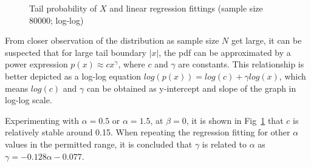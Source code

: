 \documentclass[11pt, twocolumn]{article}
\begin{document}
\begin{figure}[h]
    \centering

    \caption{Tail probability of $X$ and linear regression fittings (sample size 80000; log-log)}
    \label{fig:q4_2_linreg}
\end{figure}

From closer observation of the distribution as sample size $N$ get large, it can be suspected that for large tail boundary $|x|$, the pdf can be approximated by a power expression $p(x)\approx cx^\gamma$, where $c$ and $\gamma$ are constants.
This relationship is better depicted as a log-log equation $log(p(x))=log(c) +\gamma log(x)$, which means $log(c)$ and $\gamma$ can be obtained as y-intercept and slope of the graph in log-log scale.

Experimenting with $\alpha=0.5$ or $\alpha=1.5$, at $\beta=0$, it is shown in Fig~\ref{fig:q4_2_linreg} that $c$ is relatively stable around 0.15. When repeating the regression fitting for other $\alpha$ values in the permitted range, it is concluded that $\gamma$ is related to $\alpha$ as $\gamma = -0.128\alpha - 0.077$.
\end{document}

